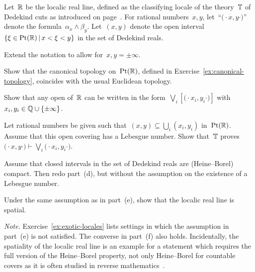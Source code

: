 \documentclass{ws-rv9x6}
\begin{document}
{\begin{exercise}%
\label{ex:spatiality-reals}%
\newcommand{\fa}{\ensuremath{(\!\cdot}}%
\newcommand{\fb}{\ensuremath{\cdot\!)}}%
Let~$\mathbb{R}$ be the localic real line, defined as the classifying locale of the
theory~$\mathbb{T}$ of Dedekind cuts as introduced on
page~\pageref{par:dedekind-cuts}. For rational numbers~$x,y$, let~``$\fa x,y
\fb$'' denote the formula~$\alpha_x \wedge \beta_y$. Let~$(x,y)$ denote the
open interval~$\{ \xi \in \mathrm{Pt}(\mathbb{R}) \,|\, x < \xi < y \}$ in the set of Dedekind reals.
\begin{alphlist}[(f)]
\item Extend the notation to allow for~$x,y=\pm\infty$.
\item Show that the canonical topology on~$\mathrm{Pt}(\mathbb{R})$, defined in
Exercise~\ref{ex:canonical-topology}, coincides with the usual Euclidean
topology.
\item Show that any open of~$\mathbb{R}$ can be written in the form~$\bigvee_i
[\fa x_i,y_i \fb]$ with~$x_i,y_i \in \mathbb{Q} \cup \{\pm\infty\}$.
\item Let rational numbers be given such that~$(x,y) \subseteq \bigcup_i
(x_i,y_i)$ in~$\mathrm{Pt}(\mathbb{R})$. Assume that this open covering has a Lebesgue number.
Show that~$\mathbb{T}$ proves~$\fa x,y \fb \vdash \bigvee_i \fa x_i,y_i \fb$.
\item Assume that closed intervals in the set of Dedekind reals are
(Heine--Borel) compact. Then redo part~(d), but without the assumption on the
existence of a Lebesgue number.
\item Under the same assumption as in part~(e), show that the localic real line
is spatial.
\end{alphlist}
{\scriptsize\emph{Note.} Exercise~\ref{ex:exotic-locales} lists settings in
which the assumption in part~(e) is not satisfied. The converse in part~(f)
also holds. Incidentally, the spatiality of the localic real line is an example
for a statement which requires the full version of the Heine--Borel property,
not only Heine--Borel for countable covers as it is often studied in reverse
mathematics~\cite{normann-sanders:uncountable}.\par}
\end{exercise}

}
\end{document}

